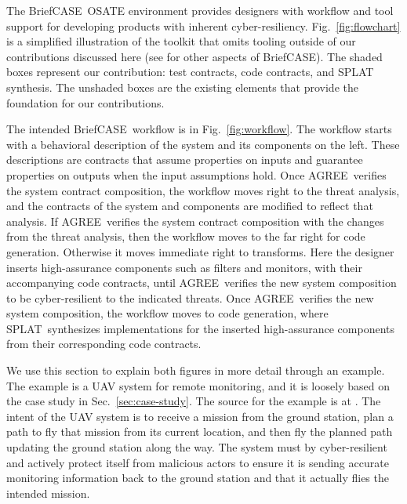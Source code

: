 \documentclass[global,twocolumn]{svjour}
\newcommand{\figref}[1]{Fig.~\ref{#1}}
\newcommand{\secref}[1]{Sec.~\ref{#1}}
\newcommand{\brfcs}{BriefCASE}
\newcommand{\agr}{AGREE}
\newcommand{\splt}{SPLAT}
\begin{document}
The \brfcs\ OSATE environment provides designers with workflow and tool support for developing products with
inherent cyber-resiliency.
%
\figref{fig:flowchart} is a simplified illustration of the toolkit that omits tooling outside of our contributions discussed here (see \cite{dcrypps2019,gearcase2020,resolute-destion,attestation-copland,awas,hamr,sel4-sosp09, sel4-tocs14, sel4-cacm18} for other aspects of \brfcs).
%
The shaded boxes represent our contribution: test contracts, code contracts, and SPLAT synthesis.
The unshaded boxes are the existing elements that provide the foundation for our contributions.

The intended \brfcs\ workflow is in \figref{fig:workflow}.
%
The workflow starts with a behavioral description of the system and its components on the left.
%
These descriptions are contracts that assume properties on inputs and guarantee properties on outputs when the input assumptions hold.
Once \agr\ verifies the system contract composition, the workflow moves right to the threat analysis, and the contracts of the system and components are modified to reflect that analysis.
%
If \agr\ verifies the system contract composition with the changes from the threat analysis, then the workflow moves to the far right for code generation.
%
Otherwise it moves immediate right to transforms.
Here the designer inserts high-assurance components such as filters and monitors, with their accompanying code contracts, until \agr\ verifies the new system composition to be cyber-resilient to the indicated threats.
%
Once \agr\ verifies the new system composition, the workflow moves to code generation, where \splt\ synthesizes implementations for the inserted high-assurance components from their corresponding code contracts.

We use this section to explain both figures in more detail through an example.
%
The example is a UAV system for remote monitoring, and it is loosely based on
the case study in \secref{sec:case-study}.
%
The source for the example is at \cite{repo}.
%
The intent of the UAV system is to receive a mission from the ground station, plan a path to fly that mission from its current location, and then fly the planned path updating the ground station along the way.
%
The system must by cyber-resilient and actively protect itself from malicious actors to ensure it is sending accurate monitoring information back to the ground station and that it actually flies the intended mission.

\end{document}
